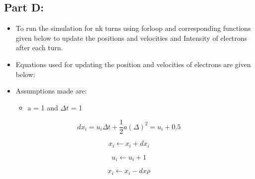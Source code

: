 \documentclass[10pt,notitlepage,onecolumn,aps,pra]{revtex4-1}
\providecommand{\tightlist}{%
      \setlength{\itemsep}{0pt}\setlength{\parskip}{0pt}}
\begin{document}
    \subsection{Part D:}\label{part-d}

\begin{itemize}
\tightlist
\item
  To run the simulation for nk turns using forloop and corresponding
  functions given below to update the positions and velocities and
  Intensity of electrons after each turn.
\item
  Equations used for updating the position and velocities of electrons
  are given below:
\item
  Assumptions made are:

  \begin{itemize}
  \tightlist
  \item
    a = 1 and \(\Delta t\) = 1
  \end{itemize}
\end{itemize}

\begin{equation}
  dx_i = u_i\Delta t + \frac{1}{2}a(\Delta)^{2} = u_i + 0.5
  \end{equation}

\begin{equation}
 x_i \leftarrow x_i + dx_i
  \end{equation}

\begin{equation}
 u_i \leftarrow u_i + 1
  \end{equation}

\begin{equation}
 x_i \leftarrow x_i - dx\rho
  \end{equation}
\end{document}
